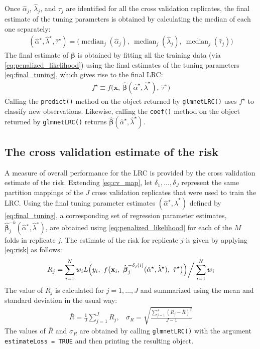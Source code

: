 \documentclass{article}
\DeclareMathOperator*{\median}{median}
\begin{document}
Once $\hat\alpha_j$, $\hat\lambda_j$, and $\hat\tau_j$ are identified for all the cross validation replicates, 
the final estimate of the tuning parameters is obtained by calculating the median of each one separately:
\begin{align}
\label{eq:final_tuning}
(\hat\alpha^\star,\hat\lambda^\star,\hat\tau^\star) = \bigl(\median_j(\hat\alpha_j), ~\median_j(\hat\lambda_j),
  ~\median_j(\hat\tau_j) \bigr)
\end{align}
\noindent The final estimate of $\boldsymbol\beta$ is obtained by fitting all the training 
data (via \eqref{eq:penalized_likelihood}) using the final estimates of the tuning parameters \eqref{eq:final_tuning}, 
which gives rise to the final LRC:
\begin{align}
f^\star \equiv f \bigl(\mathbf{x}, ~\hat{\boldsymbol{\beta}}(\hat\alpha^\star, \hat\lambda^\star), ~\hat\tau^\star \bigr)
\end{align}
\noindent Calling the {\tt predict()} method on the object returned by {\tt glmnetLRC()} uses $f^\star$ to classify
new observations.  Likewise, calling the {\tt coef()} method on the object returned by {\tt glmnetLRC()} returns 
$\hat{\boldsymbol\beta}(\hat\alpha^\star,\hat\lambda^\star)$.

\subsection{The cross validation estimate of the risk}

A measure of overall performance for the LRC is provided by the cross validation estimate of the risk. Extending
\eqref{eq:cv_map}, let $\delta_1, \ldots, \delta_J$
represent the same partition mappings of the $J$ cross validation replicates that were used to train the LRC. 
Using the final tuning parameter estimates $(\hat\alpha^\star,\hat\lambda^\star)$ defined by \eqref{eq:final_tuning}, 
a corresponding set of regression parameter estimates, $\hat{\boldsymbol\beta}_j^{-k}(\hat\alpha^\star,\hat\lambda^\star)$, 
are obtained using \eqref{eq:penalized_likelihood} 
for each of the $M$ folds in replicate $j$.  The estimate of the risk for replicate $j$ is given by applying \eqref{eq:risk} 
as follows:
\begin{align}
\label{eq:final_risk_j}
R_j  = \sum_{i=1}^N w_i L \Bigl(y_i, ~ f\bigl(\mathbf{x}_i,
~\hat{\boldsymbol\beta}_j^{-\delta_j(i)}(\hat\alpha^\star,\hat\lambda^\star),  ~\hat\tau^\star \bigr) \Bigr) \bigg/ \sum_{i=1}^N w_i
\end{align}
The value of $R_j$ is calculated for $j = 1,\ldots,J$ and summarized using the mean and standard deviation
in the usual way:
\begin{align}
\bar{R} = \frac{1}{J}\sum_{j=1}^J R_j,  ~~~~ \sigma_R = \sqrt{\frac{\sum_{j=1}^J(R_j - \bar{R})^2}{J-1}}
\end{align}
The values of $\bar{R}$ and $\sigma_R$ are obtained by calling {\tt glmnetLRC()} with the argument {\tt estimateLoss = TRUE}
and then printing the resulting object.



\end{document}
